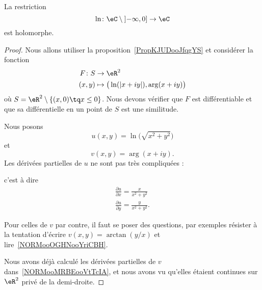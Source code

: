 \begin{theorem}     \label{THOooWUXOooYKvLbJ}
    La restriction
    \begin{equation}
        \ln\colon \eC\setminus\mathopen] -\infty , 0 \mathclose]\to \eC
    \end{equation}
    est holomorphe.
\end{theorem}

\begin{proof}
    Nous allons utiliser la proposition~\ref{PropKJUDooJfqgYS} et considérer la fonction
    \begin{equation}
        \begin{aligned}
            F\colon S&\to \eR^2 \\
            (x,y)&\mapsto \big( \ln(| x+iy |),\arg(x+iy) \big)
        \end{aligned}
    \end{equation}
    où \( S=\eR^2\setminus\{ (x,0)\tq x\leq 0 \}\). Nous devons vérifier que \( F\) est différentiable et que sa différentielle en un point de \( S\) est une similitude.

    Nous posons
    \begin{equation}
        u(x,y)=\ln\big( \sqrt{ x^2+y^2 } \big)
    \end{equation}
    et
    \begin{equation}
        v(x,y)=\arg(x+iy).
    \end{equation}
    Les dérivées partielles de \( u\) ne sont pas très compliquées :
    
    c'est à dire
    \begin{subequations}
        \begin{align}
            \frac{ \partial u }{ \partial x }=\frac{ x }{ x^2+y^2 }\\
            \frac{ \partial u }{ \partial y }=\frac{ y }{ x^2+y^2 }.
        \end{align}
    \end{subequations}

    Pour celles de \( v \) par contre, il faut se poser des questions, par exemples résister à la tentation d'écrire \( v(x,y)=\arctan(y/x)\) et lire~\ref{NORMooOGHNooYriCBH}.

    Nous avons déjà calculé les dérivées partielles de \( v\) dans~\ref{NORMooMRBEooVtTcIA}, et nous avons vu qu'elles étaient continues sur \( \eR^2\) privé de la demi-droite.


\end{proof}
